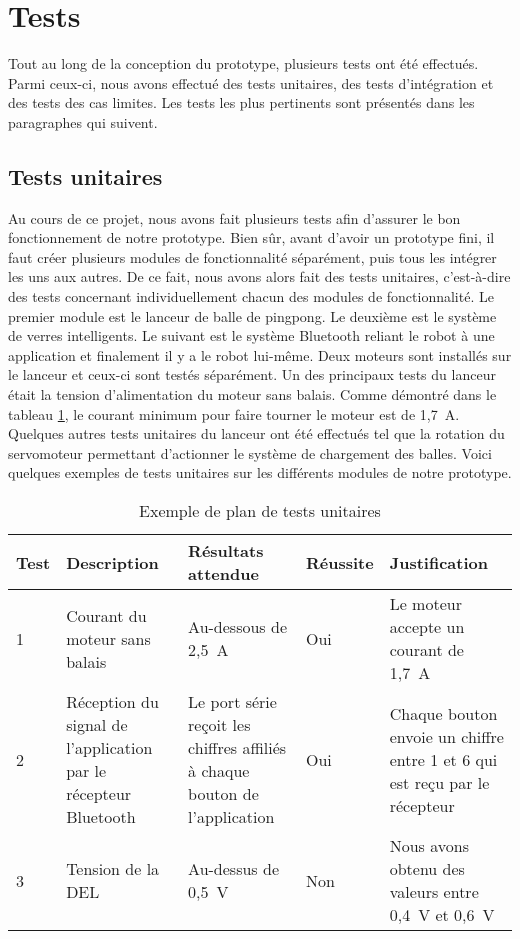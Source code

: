 \section{Tests}


Tout au long de la conception du prototype, plusieurs tests ont été effectués.
Parmi ceux-ci, nous avons effectué des tests unitaires, des tests d'intégration et des tests des cas limites.
Les tests les plus pertinents sont présentés dans les paragraphes qui suivent.

\subsection{Tests unitaires}

Au cours de ce projet, nous avons fait plusieurs tests afin d’assurer le bon fonctionnement de notre prototype.
Bien sûr, avant d’avoir un prototype fini, il faut créer plusieurs modules de fonctionnalité séparément, puis tous les intégrer les uns aux autres.
De ce fait, nous avons alors fait des tests unitaires, c’est-à-dire des tests concernant individuellement chacun des modules de fonctionnalité.
Le premier module est le lanceur de balle de pingpong.
Le deuxième est le système de verres intelligents.
Le suivant est le système Bluetooth reliant le robot à une application et finalement il y a le robot lui-même.
Deux moteurs sont installés sur le lanceur et ceux-ci sont testés séparément.
Un des principaux tests du lanceur était la tension d’alimentation du moteur sans balais.
Comme démontré dans le tableau \ref{tab:s3-test-unitaires}, le courant minimum pour faire tourner le moteur est de 1,7~A.
Quelques autres tests unitaires du lanceur ont été effectués tel que la rotation du servomoteur permettant d’actionner le système de chargement des balles.
Voici quelques exemples de tests unitaires sur les différents modules de notre prototype.

\begin{table}[h!]
    \centering
    \begin{tabular}{p{0.25in}p{1.5in}p{1.5in}p{0.5in}p{1.5in}}
        \hline
        \bfseries Test & \bfseries Description & \bfseries Résultats attendue & \bfseries Réussite & \bfseries Justification \\
        \hline\hline
        1 & Courant du moteur sans balais & Au-dessous de 2,5~A & Oui & Le moteur accepte un courant de 1,7~A \\
        2 & Réception du signal de l’application par le récepteur Bluetooth & Le port série reçoit les chiffres affiliés à chaque bouton de l’application & Oui & Chaque bouton envoie un chiffre entre 1 et 6 qui est reçu par le récepteur \\
        3 & Tension de la DEL & Au-dessus de 0,5~V & Non & Nous avons obtenu des valeurs entre 0,4~V et 0,6~V \\
        \hline
    \end{tabular}
    \caption{Exemple de plan de tests unitaires}
    \label{tab:s3-test-unitaires}
\end{table}

